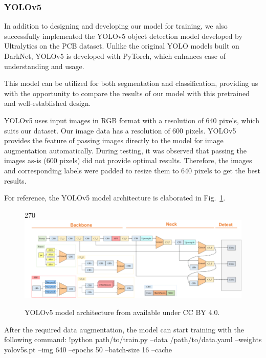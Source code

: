 \documentclass[12pt]{article}
\begin{document}
\clearpage
\newpage


\subsubsection{YOLOv5}
In addition to designing and developing our model for training, we also successfully implemented the YOLOv5 object detection model developed by Ultralytics on the PCB dataset. Unlike the original YOLO models built on DarkNet, YOLOv5 is developed with PyTorch, which enhances ease of understanding and usage.

This model can be utilized for both segmentation and classification, providing us with the opportunity to compare the results of our model with this pretrained and well-established design.

YOLOv5 uses input images in RGB format with a resolution of 640 pixels, which suits our dataset. Our image data has a resolution of 600 pixels. YOLOv5 provides the feature of passing images directly to the model for image augmentation automatically. During testing, it was observed that passing the images as-is (600 pixels) did not provide optimal results. Therefore, the images and corresponding labels were padded to resize them to 640 pixels to get the best results.

For reference, the YOLOv5 model architecture is elaborated in Fig.~\ref{fig:yolov5model}.

\begin{figure}[p]
    \centering
    \begin{turn}{270}
    \includegraphics[width=1\paperwidth,height=1\paperheight,keepaspectratio]{./graphics/YOLOv5-architecture.png}
    \end{turn}
    \caption{YOLOv5 model architecture from \cite{Kim2021} available under CC BY 4.0.}
    \label{fig:yolov5model}
\end{figure}
\restoregeometry

After the required data augmentation, the model can start training with the following command:
!python path/to/train.py --data /path/to/data.yaml --weights yolov5s.pt --img 640 --epochs 50 --batch-size 16 --cache
\end{document}
